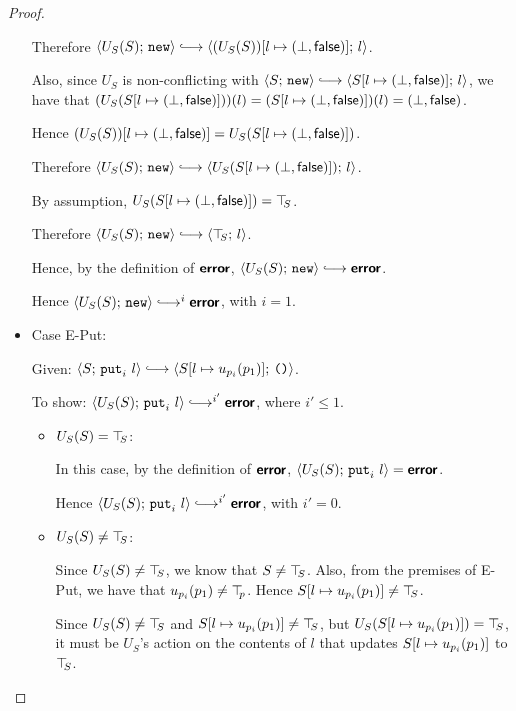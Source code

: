 \begin{proof}
\begin{itemize}
    Therefore $\config{U_S(S)}{\NEW} \parstepsto
    \config{\extS{(U_S(S))}{l}{\bot}{\frozenfalse}}{l}$.

    Also, since $U_S$ is non-conflicting with $\config{S}{\NEW}
    \parstepsto \config{\extS{S}{l}{\bot}{\frozenfalse}}{l}$, we
    have that $(U_S(S[l \mapsto (\bot, \textsf{false})]))(l) =
    (S[l \mapsto (\bot, \textsf{false})])(l) =
    (\bot, \textsf{false})$.

    Hence $(U_S(S))[l \mapsto (\bot, \textsf{false})] =
    U_S(S[l \mapsto (\bot, \textsf{false})])$.

    Therefore $\config{U_S(S)}{\NEW} \parstepsto
    \config{U_S(\extS{S}{l}{\bot}{\frozenfalse})}{l}$.

    By assumption, $U_S(S[l \mapsto (\bot, \textsf{false})]) = \top\hspace{-0.85mm}_{S}$.

    Therefore $\config{U_S(S)}{\NEW} \parstepsto \config{\topS}{l}$.

    Hence, by the definition of $\textbf{\textsf{error}}$, $\config{U_S(S)}{\NEW}
    \parstepsto \error$.

    Hence $\config{U_S(S)}{\NEW} \parstepsto^i \error$, with $i = 1$.

  \item Case {\sc E-Put}:

    Given: $\config{S}{\putiexp{l}} \parstepsto
    \config{\extSRaw{S}{l}{u_{p_i}(p_1)}}{\unit}$.

    To show: $\config{U_S(S)}{\putiexp{l}} \parstepsto^{i'} \error$,
    where $i' \leq 1$.

    \begin{itemize}

      \item $U_S(S) = \top\hspace{-0.85mm}_{S}$:

        In this case, by the definition of $\textbf{\textsf{error}}$,
        $\langle U_S(S);\, \mbox{\texttt{put}}_i~l \rangle = \textbf{\textsf{error}}$.

        Hence $\config{U_S(S)}{\putiexp{l}}
        \parstepsto^{i'} \error$, with $i' = 0$.

      \item $U_S(S) \neq \top\hspace{-0.85mm}_{S}$:

        Since $U_S(S) \neq \top\hspace{-0.85mm}_{S}$, we know that $S \neq \top\hspace{-0.85mm}_{S}$.  Also,
        from the premises of {\sc E-Put}, we have that $u_{p_i}(p_1)
        \neq \top\hspace{-0.85mm}_{p}$.  Hence $S[l \mapsto u_{p_i}(p_1)] \neq \top\hspace{-0.85mm}_{S}$.

        Since $U_S(S) \neq \top\hspace{-0.85mm}_{S}$ and $S[l \mapsto u_{p_i}(p_1)]
        \neq \top\hspace{-0.85mm}_{S}$, but $U_S(S[l \mapsto u_{p_i}(p_1)]) = \top\hspace{-0.85mm}_{S}$,
        it must be $U_S$'s action on the contents of $l$ that updates
        $S[l \mapsto u_{p_i}(p_1)]$ to $\top\hspace{-0.85mm}_{S}$.


\end{itemize}
\end{itemize}
\end{proof}
